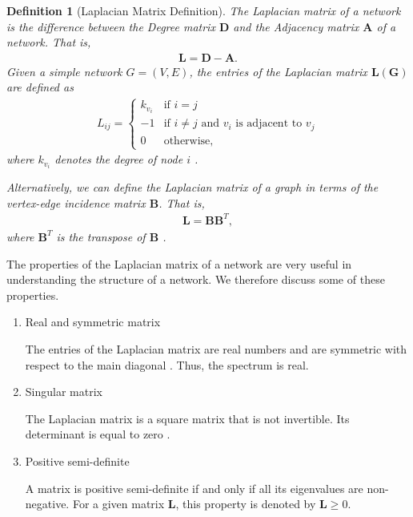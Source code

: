 \documentclass[10pt,a4paper]{article}
\newtheorem{defn}{Definition}
\begin{document}
\begin{defn}[Laplacian Matrix Definition]
	The Laplacian matrix of a network is the difference between the Degree matrix $\mathbf{D}$ and the Adjacency matrix $\mathbf{A}$ of a network. That is,
	\begin{eqnarray}
	\mathbf{L} = \mathbf{D} - \mathbf{A}.
	\end{eqnarray}
	Given a simple network $G=(V,E)$, the entries of the Laplacian matrix $\mathbf{L(G)}$  are defined as
	\begin{eqnarray}
	L_{ij} = \begin{cases} k_{v_i} &\mbox{if } i = j \\
	-1 &\mbox{if } i \neq j \text{ and } v_i \text{ is adjacent to } v_j \\
	0 & \text{otherwise},
	\end{cases}
	\end{eqnarray}
	where $k_{v_i}$  denotes the degree of node $i$ \citep{estrada2011structure}.
	
	Alternatively, we can define the Laplacian matrix of a graph in terms of the vertex-edge incidence matrix $\mathbf{B}$. That is,
	\begin{eqnarray}
	\mathbf{L} =  \mathbf{B} \mathbf{B}^T,
	\label{lintermsb}
	\end{eqnarray}
	where $\mathbf{B}^T$ is the transpose of $\mathbf{B}$ \citep{estrada2011structure}.
\end{defn}

The properties of the Laplacian matrix of a network are very useful in understanding the structure of a network. We therefore discuss some of these properties.
\begin{enumerate}	
	\item{Real and symmetric matrix} 
	
	The entries of the Laplacian matrix are real numbers and are symmetric with respect to the main diagonal \citep{das2004laplacian}. Thus, the spectrum is real.
	\item{Singular matrix}
	
	The Laplacian matrix is a square matrix that is not invertible. Its determinant is equal to zero \citep{das2004laplacian}.
	\item{Positive semi-definite}
	
	A matrix is positive semi-definite if and only if all its eigenvalues are non-negative. For a given matrix $\mathbf{L}$, this property is denoted by $\mathbf{L}\geq 0$. 
	
\end{enumerate}
\end{document}
